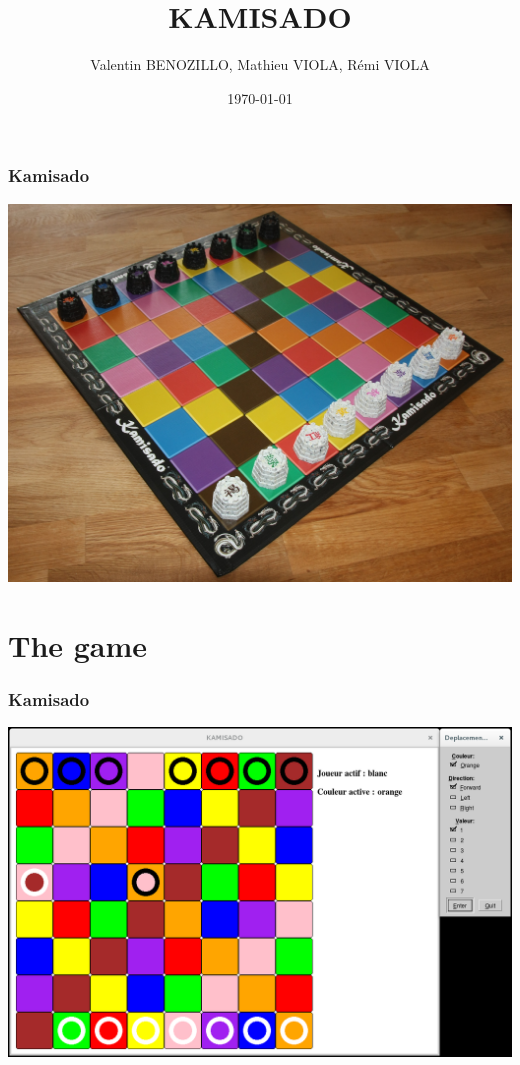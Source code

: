 \documentclass[a4paper, 11pt]{beamer}
\title{KAMISADO}
\author{Valentin BENOZILLO, Mathieu VIOLA, Rémi VIOLA}
\date{\today}
\begin{document}
\begin{frame}
 \titlepage
\end{frame}

\begin{frame}
 \tableofcontents
\end{frame}

\begin{frame}
 \frametitle{Kamisado}
 \begin{center}
  \includegraphics[scale = 0.07]{kamisado.jpeg}
 \end{center}
\end{frame}

\section{The game}
\begin{frame}
 \frametitle{Kamisado}
 \begin{center}
  \includegraphics[scale = 0.25]{kamisado.png}
 \end{center}
\end{frame}
\end{document}

